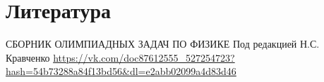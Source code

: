 \documentclass[a4paper,12pt]{article} %
\begin{document}
\section{Литература}
\begin{thebibliography}
     СБОРНИК ОЛИМПИАДНЫХ ЗАДАЧ ПО ФИЗИКЕ Под редакцией Н.С. Кравченко
     \url{https://vk.com/doc87612555_527254723?hash=54b73288a84f13bd56&dl=e2abb02099a4d83d46}
	
\end{thebibliography}
\end{document}
